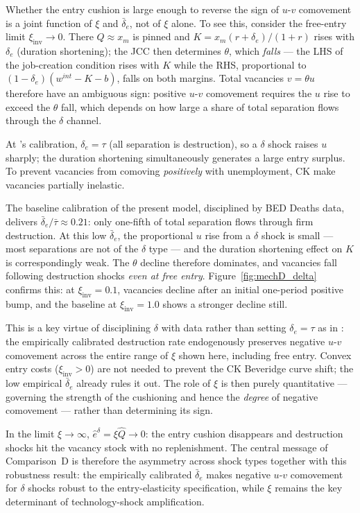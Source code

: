 \documentclass[authoryear, review, 12pt]{elsarticle}
\begin{document}
Whether the entry cushion is large enough to reverse the sign of
$u$-$v$ comovement is a joint function of $\xi$ and $\bar\delta_e$,
not of $\xi$ alone.  To see this, consider the free-entry limit
$\xi_{\mathrm{inv}}\to 0$.  There $Q\approx x_m$ is pinned and
$K=x_m(r+\delta_e)/(1+r)$ rises with $\delta_e$ (duration shortening);
the JCC then determines $\theta$, which \emph{falls} --- the LHS of the
job-creation condition rises with $K$ while the RHS, proportional to
$(1-\delta_e)(w^{int}-K-b)$, falls on both margins.  Total vacancies
$v=\theta u$ therefore have an ambiguous sign: positive $u$-$v$
comovement requires the $u$ rise to exceed the $\theta$ fall, which
depends on how large a share of total separation flows through the
$\delta$ channel.

At \citeauthor{coles_2018}'s calibration, $\delta_e=\tau$ (all separation
is destruction), so a $\delta$ shock raises $u$ sharply; the duration
shortening simultaneously generates a large entry surplus. To prevent vacancies from comoving \emph{positively} with unemployment, CK make vacancies partially inelastic.

The baseline calibration of the present model, disciplined by BED Deaths
data, delivers $\bar\delta_e/\bar\tau\approx 0.21$: only one-fifth of
total separation flows through firm destruction.  At this low $\bar\delta_e$,
the proportional $u$ rise from a $\delta$ shock is small --- most
separations are not of the $\delta$ type --- and the duration shortening
effect on $K$ is correspondingly weak.  The $\theta$ decline therefore
dominates, and vacancies fall following destruction shocks
\emph{even at free entry}.  Figure~\ref{fig:mechD_delta} confirms this:
at $\xi_{\mathrm{inv}}=0.1$, vacancies decline after an initial one-period
positive bump, and
the baseline at $\xi_{\mathrm{inv}}=1.0$ shows a stronger decline still.

This is a key virtue of disciplining $\delta$ with data rather than
setting $\delta_e=\tau$ as in \citet{coles_2018}: the empirically
calibrated destruction rate endogenously preserves negative $u$-$v$
comovement across the entire range of $\xi$ shown here, including free
entry.  Convex entry costs ($\xi_{\mathrm{inv}}>0$) are not needed to
prevent the CK Beveridge curve shift; the low empirical $\bar\delta_e$
already rules it out.  The role of $\xi$ is then purely quantitative ---
governing the strength of the cushioning and hence the \emph{degree} of
negative comovement --- rather than determining its sign.

In the limit $\xi\to\infty$, $\hat{e}^\delta=\xi\hat{Q}\to 0$: the entry
cushion disappears and destruction shocks hit the vacancy stock with no
replenishment.  The central message of Comparison~D is therefore the
asymmetry across shock types together with this robustness result: the
empirically calibrated $\bar\delta_e$ makes negative $u$-$v$ comovement
for $\delta$ shocks robust to the entry-elasticity specification, while
$\xi$ remains the key determinant of technology-shock amplification.
\end{document}
